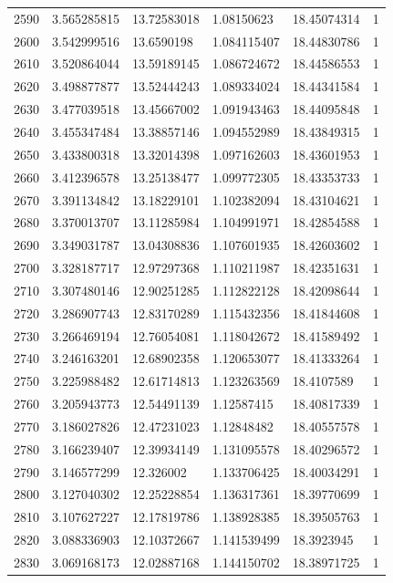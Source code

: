 \begin{longtable}{llllll}
2590 & 3.565285815 & 13.72583018 & 1.08150623 & 18.45074314 & 1 \\
2600 & 3.542999516 & 13.6590198 & 1.084115407 & 18.44830786 & 1 \\
2610 & 3.520864044 & 13.59189145 & 1.086724672 & 18.44586553 & 1 \\
2620 & 3.498877877 & 13.52444243 & 1.089334024 & 18.44341584 & 1 \\
2630 & 3.477039518 & 13.45667002 & 1.091943463 & 18.44095848 & 1 \\
2640 & 3.455347484 & 13.38857146 & 1.094552989 & 18.43849315 & 1 \\
2650 & 3.433800318 & 13.32014398 & 1.097162603 & 18.43601953 & 1 \\
2660 & 3.412396578 & 13.25138477 & 1.099772305 & 18.43353733 & 1 \\
2670 & 3.391134842 & 13.18229101 & 1.102382094 & 18.43104621 & 1 \\
2680 & 3.370013707 & 13.11285984 & 1.104991971 & 18.42854588 & 1 \\
2690 & 3.349031787 & 13.04308836 & 1.107601935 & 18.42603602 & 1 \\
2700 & 3.328187717 & 12.97297368 & 1.110211987 & 18.42351631 & 1 \\
2710 & 3.307480146 & 12.90251285 & 1.112822128 & 18.42098644 & 1 \\
2720 & 3.286907743 & 12.83170289 & 1.115432356 & 18.41844608 & 1 \\
2730 & 3.266469194 & 12.76054081 & 1.118042672 & 18.41589492 & 1 \\
2740 & 3.246163201 & 12.68902358 & 1.120653077 & 18.41333264 & 1 \\
2750 & 3.225988482 & 12.61714813 & 1.123263569 & 18.4107589 & 1 \\
2760 & 3.205943773 & 12.54491139 & 1.12587415 & 18.40817339 & 1 \\
2770 & 3.186027826 & 12.47231023 & 1.12848482 & 18.40557578 & 1 \\
2780 & 3.166239407 & 12.39934149 & 1.131095578 & 18.40296572 & 1 \\
2790 & 3.146577299 & 12.326002 & 1.133706425 & 18.40034291 & 1 \\
2800 & 3.127040302 & 12.25228854 & 1.136317361 & 18.39770699 & 1 \\
2810 & 3.107627227 & 12.17819786 & 1.138928385 & 18.39505763 & 1 \\
2820 & 3.088336903 & 12.10372667 & 1.141539499 & 18.3923945 & 1 \\
2830 & 3.069168173 & 12.02887168 & 1.144150702 & 18.38971725 & 1 \\

\end{longtable}
